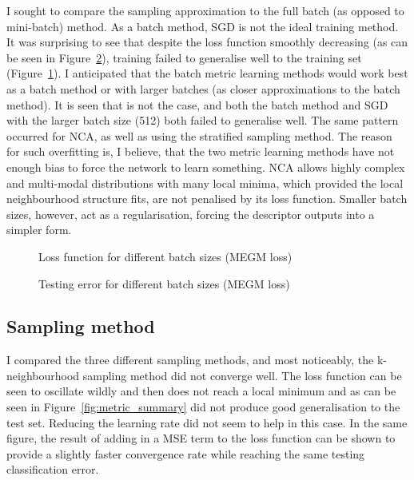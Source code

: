 I sought to compare the sampling approximation to the full batch (as opposed to mini-batch) method. As a batch method, \gls{SGD} is not the ideal training method. It was surprising to see that despite the loss function smoothly decreasing (as can be
seen in Figure~\ref{fig:metric_megm_test}), training failed to generalise well to the training set (Figure~\ref{fig:metric_megm_loss}).
I anticipated that the batch metric learning methods would work best as a batch
method or with larger batches (as closer approximations to the batch method).
It is seen that is not the case, and both the batch method and \gls{SGD} with the larger batch size (512) both failed to generalise well. The same pattern occurred for \gls{NCA}, as well as using the stratified sampling method. The reason for such overfitting is, I believe, that the two metric learning methods have not enough bias to force the network to learn something. \gls{NCA} allows highly complex and multi-modal distributions with many local minima, which provided the local neighbourhood structure fits, are not penalised by its loss function. Smaller batch sizes, however, act as a regularisation, forcing the descriptor outputs into a simpler form.



\begin{figure}[ht]
   
   \caption{Loss function for different batch sizes (MEGM loss)}
   \label {fig:metric_megm_loss}
\end{figure}

\begin{figure}[ht]
   
   \caption{Testing error for different batch sizes (MEGM loss)}
   \label {fig:metric_megm_test}
\end{figure}



\subsection{Sampling method}

I compared the three different sampling methods, and most noticeably, the k-neighbourhood sampling method did not converge well. The loss function can be seen to oscillate wildly and then does not reach a local minimum and as can be seen in Figure~\ref{fig:metric_summary} did not produce good generalisation to the test set. Reducing the learning rate did not seem to help in this case. In the same figure, the result of adding in a \gls{MSE} term to the loss function can be shown to provide a slightly faster convergence rate while reaching the same testing classification error. 


